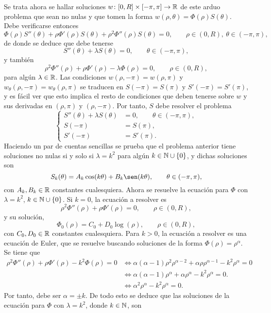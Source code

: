 \documentclass[a4paper, 12pt, extrafontsizes]{memoir}
\begin{document}
Se trata ahora se hallar soluciones $w \colon [0,R] \times [-\pi,\pi] \to \mathbb R$ de este arduo problema que sean no nulas y que tomen la forma $w(\rho,\theta)=\Phi(\rho)S(\theta)$. Debe verificarse entonces
\[\Phi(\rho)S''(\theta)+\rho \Phi'(\rho)S(\theta)+\rho^2\Phi''(\rho)S(\theta) = 0, \qquad \rho \in (0,R), \ \theta \in (-\pi,\pi),\]
de donde se deduce que debe tenerse
\[S''(\theta)+\lambda S(\theta)=0, \qquad \theta \in (-\pi,\pi),\]
y también
\[\rho^2\Phi''(\rho)+\rho \Phi'(\rho)-\lambda \Phi(\rho) = 0, \qquad \rho \in (0,R),\]
para algún $\lambda \in \mathbb R$.
Las condiciones $w(\rho,-\pi) = w(\rho,\pi)$ y $w_\theta(\rho,-\pi) = w_\theta(\rho,\pi)$ se traducen en $S(-\pi)=S(\pi)$ y $S'(-\pi) = S'(\pi)$, y es fácil ver que esto implica el resto de condiciones que deben tenerse sobre $w$ y sus derivadas en $(\rho,\pi)$ y $(\rho,-\pi)$. Por tanto, $S$ debe resolver el problema
\[\left\{\begin{alignedat}{2}
    S''(\theta)+\lambda S(\theta) &= 0, \qquad \theta \in (-\pi,\pi), \\
    S(-\pi) &= S(\pi), \\
    S'(-\pi) &= S'(\pi).
\end{alignedat}\right.\]
Haciendo un par de cuentas sencillas se prueba que el problema anterior tiene soluciones no nulas si y solo si $\lambda = k^2$ para algún $k \in \mathbb N \cup \{0\}$, y dichas soluciones son
\[S_k(\theta) = A_k\cos(k\theta)+B_k\sen(k \theta), \qquad \theta \in (-\pi,\pi),\]
con $A_k,B_k \in \mathbb R$ constantes cualesquiera. Ahora se resuelve la ecuación para $\Phi$ con $\lambda = k^2$, $k \in \mathbb N \cup \{0\}$. Si $k = 0$, la ecuación a resolver es
\[\rho^2\Phi''(\rho)+\rho \Phi'(\rho) = 0, \qquad \rho \in (0,R),\]
y su solución,
\[\Phi_0(\rho) = C_0+D_0\log(\rho), \qquad \rho \in (0,R),\]
con $C_0,D_0 \in \mathbb R$ constantes cualesquiera. Para $k > 0$, la ecuación a resolver es una ecuación de Euler, que se resuelve buscando soluciones de la forma $\Phi(\rho) = \rho^\alpha$. Se tiene que
\begin{align*}
    \rho^2\Phi''(\rho) +\rho \Phi'(\rho) -k^2\Phi(\rho) = 0 &\iff \alpha(\alpha-1)\rho^2\rho^{\alpha-2}+\alpha\rho\rho^{\alpha-1}-k^2\rho^\alpha = 0 \\
    &\iff \alpha(\alpha-1)\rho^{\alpha}+\alpha\rho^{\alpha}-k^2\rho^\alpha = 0. \\
    &\iff \alpha^2\rho^\alpha-k^2\rho^\alpha = 0.
\end{align*}
Por tanto, debe ser $\alpha = \pm k$. De todo esto se deduce que las soluciones de la ecuación para $\Phi$ con $\lambda = k^2$, donde $k \in \mathbb N$, son
\end{document}
